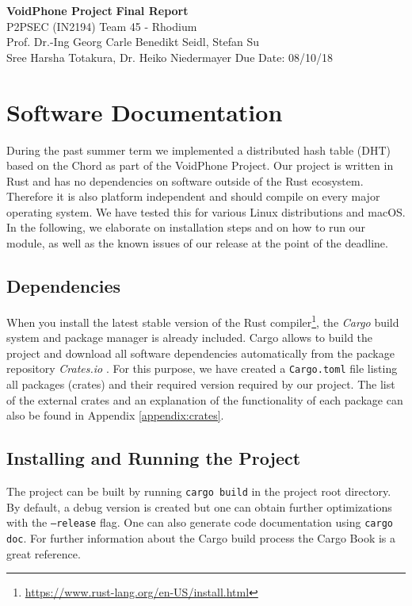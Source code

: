 \documentclass[a4paper, 11pt]{article}
\begin{document}
    \noindent
    \large\textbf{VoidPhone Project} \hfill \textbf{Final Report}\\
    \normalsize P2PSEC (IN2194)  \hfill Team 45 - Rhodium\\
    Prof. Dr.-Ing Georg Carle \hfill Benedikt Seidl, Stefan Su\\
    Sree Harsha Totakura, Dr. Heiko Niedermayer \hfill Due Date: 08/10/18
    
    \section{Software Documentation}
    
    During the past summer term we implemented a distributed hash table (DHT) based on the Chord \cite{Chord} as part of the VoidPhone Project.
    Our project is written in Rust \cite{Rust} and has no dependencies on software outside of the Rust ecosystem.
    Therefore it is also platform independent and should compile on every major operating system. We have tested this for various Linux distributions and macOS.
    In the following, we elaborate on installation steps and on how to run our module, as well as the known issues of our release at the point of the deadline.
    
    \subsection{Dependencies}
    
    When you install the latest stable version of the Rust compiler\footnote{\url{https://www.rust-lang.org/en-US/install.html}}, the \emph{Cargo} build system and package manager is already included. Cargo allows to build the project and download all software dependencies automatically from the package repository \textit{Crates.io} \cite{Crates}. For this purpose, we have created a \texttt{Cargo.toml} file listing all packages (crates) and their required version required by our project. The list of the external crates and an explanation of the functionality of each package can also be found in Appendix \ref{appendix:crates}.
    
    \subsection{Installing and Running the Project}
    
    The project can be built by running \texttt{cargo build} in the project root directory. By default, a debug version is created but one can obtain further optimizations with the \texttt{--release} flag. One can also generate code documentation using \texttt{cargo doc}. For further information about the Cargo build process the Cargo Book \cite{CargoBook} is a great reference.
    
\end{document}
